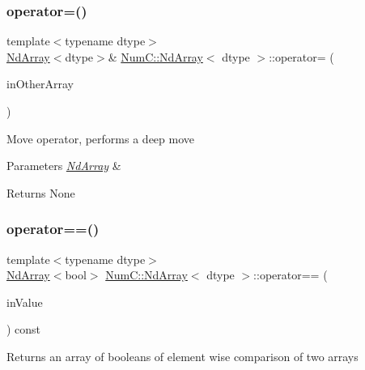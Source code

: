 \subsubsection{\texorpdfstring{operator=()}{operator=()}\hspace{0.1cm}{\footnotesize\ttfamily [2/2]}}
{\footnotesize\ttfamily template$<$typename dtype$>$ \\
\mbox{\hyperlink{class_num_c_1_1_nd_array}{Nd\+Array}}$<$dtype$>$\& \mbox{\hyperlink{class_num_c_1_1_nd_array}{Num\+C\+::\+Nd\+Array}}$<$ dtype $>$\+::operator= (\begin{DoxyParamCaption}\item[{\mbox{\hyperlink{class_num_c_1_1_nd_array}{Nd\+Array}}$<$ dtype $>$ \&\&}]{in\+Other\+Array }\end{DoxyParamCaption})\hspace{0.3cm}{\ttfamily [inline]}}

Move operator, performs a deep move


\begin{DoxyParams}{Parameters}
{\em \mbox{\hyperlink{class_num_c_1_1_nd_array}{Nd\+Array}}} & \\
\hline
\end{DoxyParams}
\begin{DoxyReturn}{Returns}
None 
\end{DoxyReturn}
\mbox{\label{class_num_c_1_1_nd_array_aba7821dd819fd42024c36706816dd4a6}} 
\subsubsection{\texorpdfstring{operator==()}{operator==()}\hspace{0.1cm}{\footnotesize\ttfamily [1/2]}}
{\footnotesize\ttfamily template$<$typename dtype$>$ \\
\mbox{\hyperlink{class_num_c_1_1_nd_array}{Nd\+Array}}$<$bool$>$ \mbox{\hyperlink{class_num_c_1_1_nd_array}{Num\+C\+::\+Nd\+Array}}$<$ dtype $>$\+::operator== (\begin{DoxyParamCaption}\item[{dtype}]{in\+Value }\end{DoxyParamCaption}) const\hspace{0.3cm}{\ttfamily [inline]}}

Returns an array of booleans of element wise comparison of two arrays


